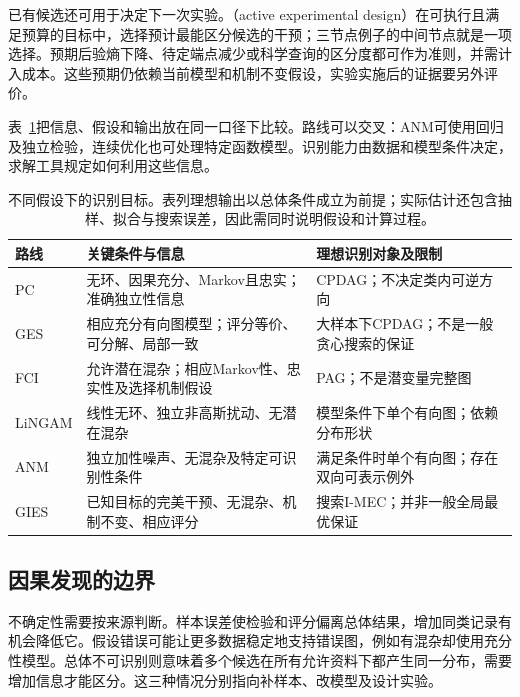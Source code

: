 已有候选还可用于决定下一次实验。（active experimental design）在可执行且满足预算的目标中，选择预计最能区分候选的干预；三节点例子的中间节点就是一项选择。预期后验熵下降、待定端点减少或科学查询的区分度都可作为准则，并需计入成本。这些预期仍依赖当前模型和机制不变假设，实验实施后的证据要另外评价。

表~\ref{tab:pgm-structure-learning-causal-routes}把信息、假设和输出放在同一口径下比较。路线可以交叉：ANM可使用回归及独立检验，连续优化也可处理特定函数模型。识别能力由数据和模型条件决定，求解工具规定如何利用这些信息。

\begin{table}[htbp]
  \centering
  \small
  \begin{tabularx}{\linewidth}{@{}lXX@{}}
    \toprule
    路线 & 关键条件与信息 & 理想识别对象及限制 \\
    \midrule
    PC & 无环、因果充分、Markov且忠实；准确独立性信息 & CPDAG；不决定类内可逆方向 \\
    GES & 相应充分有向图模型；评分等价、可分解、局部一致 & 大样本下CPDAG；不是一般贪心搜索的保证 \\
    FCI & 允许潜在混杂；相应Markov性、忠实性及选择机制假设 & PAG；不是潜变量完整图 \\
    LiNGAM & 线性无环、独立非高斯扰动、无潜在混杂 & 模型条件下单个有向图；依赖分布形状 \\
    ANM & 独立加性噪声、无混杂及特定可识别性条件 & 满足条件时单个有向图；存在双向可表示例外 \\
    GIES & 已知目标的完美干预、无混杂、机制不变、相应评分 & 搜索I-MEC；并非一般全局最优保证 \\
    \bottomrule
  \end{tabularx}
  \caption{不同假设下的识别目标。表列理想输出以总体条件成立为前提；实际估计还包含抽样、拟合与搜索误差，因此需同时说明假设和计算过程。}
  \label{tab:pgm-structure-learning-causal-routes}
\end{table}

\subsection{因果发现的边界}
\label{sec:pgm-structure-learning-causal-limits}

不确定性需要按来源判断。样本误差使检验和评分偏离总体结果，增加同类记录有机会降低它。假设错误可能让更多数据稳定地支持错误图，例如有混杂却使用充分性模型。总体不可识别则意味着多个候选在所有允许资料下都产生同一分布，需要增加信息才能区分。这三种情况分别指向补样本、改模型及设计实验。

